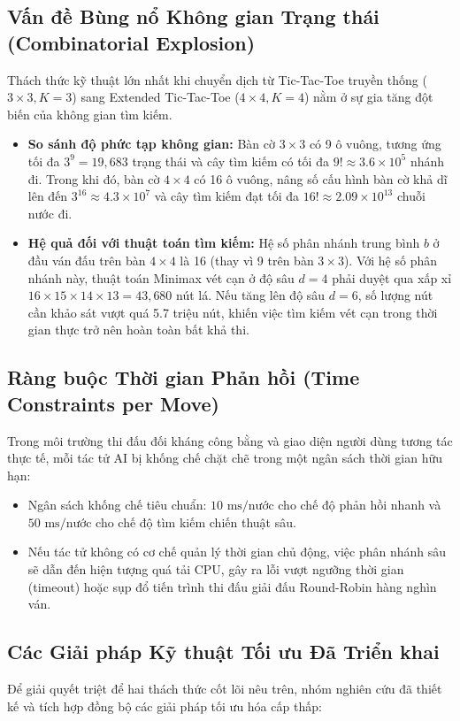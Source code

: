 \documentclass[a4paper,12pt]{report}
\begin{document}
\subsection{Vấn đề Bùng nổ Không gian Trạng thái (Combinatorial Explosion)}
Thách thức kỹ thuật lớn nhất khi chuyển dịch từ Tic-Tac-Toe truyền thống ($3 \times 3, K=3$) sang Extended Tic-Tac-Toe ($4 \times 4, K=4$) nằm ở sự gia tăng đột biến của không gian tìm kiếm.
\begin{itemize}
    \item \textbf{So sánh độ phức tạp không gian:} Bàn cờ $3 \times 3$ có 9 ô vuông, tương ứng tối đa $3^9 = 19{,}683$ trạng thái và cây tìm kiếm có tối đa $9! \approx 3.6 \times 10^5$ nhánh đi. Trong khi đó, bàn cờ $4 \times 4$ có 16 ô vuông, nâng số cấu hình bàn cờ khả dĩ lên đến $3^{16} \approx 4.3 \times 10^7$ và cây tìm kiếm đạt tối đa $16! \approx 2.09 \times 10^{13}$ chuỗi nước đi.
    \item \textbf{Hệ quả đối với thuật toán tìm kiếm:} Hệ số phân nhánh trung bình $b$ ở đầu ván đấu trên bàn $4 \times 4$ là 16 (thay vì 9 trên bàn $3 \times 3$). Với hệ số phân nhánh này, thuật toán Minimax vét cạn ở độ sâu $d=4$ phải duyệt qua xấp xỉ $16 \times 15 \times 14 \times 13 = 43{,}680$ nút lá. Nếu tăng lên độ sâu $d=6$, số lượng nút cần khảo sát vượt quá 5.7 triệu nút, khiến việc tìm kiếm vét cạn trong thời gian thực trở nên hoàn toàn bất khả thi.
\end{itemize}

\subsection{Ràng buộc Thời gian Phản hồi (Time Constraints per Move)}
Trong môi trường thi đấu đối kháng công bằng và giao diện người dùng tương tác thực tế, mỗi tác tử AI bị khống chế chặt chẽ trong một ngân sách thời gian hữu hạn:
\begin{itemize}
    \item Ngân sách khống chế tiêu chuẩn: $10\text{ ms/nước}$ cho chế độ phản hồi nhanh và $50\text{ ms/nước}$ cho chế độ tìm kiếm chiến thuật sâu.
    \item Nếu tác tử không có cơ chế quản lý thời gian chủ động, việc phân nhánh sâu sẽ dẫn đến hiện tượng quá tải CPU, gây ra lỗi vượt ngưỡng thời gian (timeout) hoặc sụp đổ tiến trình thi đấu giải đấu Round-Robin hàng nghìn ván.
\end{itemize}

\subsection{Các Giải pháp Kỹ thuật Tối ưu Đã Triển khai}
Để giải quyết triệt để hai thách thức cốt lõi nêu trên, nhóm nghiên cứu đã thiết kế và tích hợp đồng bộ các giải pháp tối ưu hóa cấp thấp:
\end{document}
